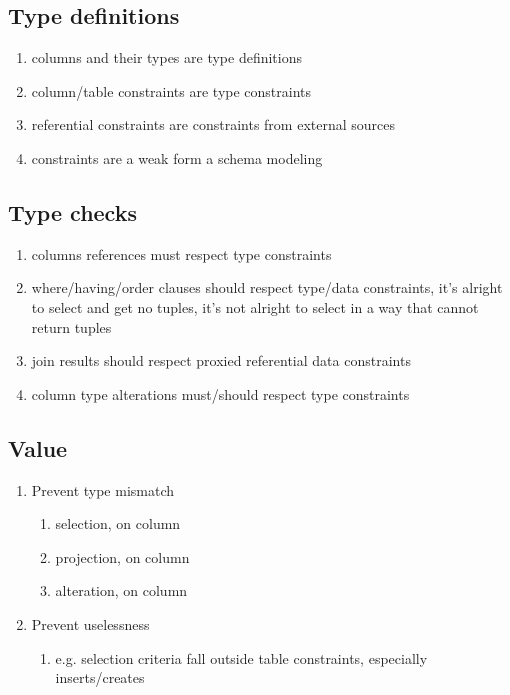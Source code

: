 \documentclass[12pt]{article}
\begin{document}
\subsection{Type definitions}

\begin{enumerate}
  \item columns and their types are type definitions
  \item column/table constraints are type constraints
  \item referential constraints are constraints from external sources
  \item constraints are a weak form a schema modeling
\end{enumerate}

\subsection{Type checks}

\begin{enumerate}
  \item columns references must respect type constraints
  \item where/having/order clauses should respect type/data constraints, it's alright to select and get no tuples, it's not alright to select in a way that cannot return tuples
  \item join results should respect proxied referential data constraints
  \item column type alterations must/should respect type constraints
\end{enumerate}

\subsection{Value}
\begin{enumerate}
  \item Prevent type mismatch
    \begin{enumerate}
      \item selection,  on  column
      \item projection,  on  column
      \item alteration,  on  column
    \end{enumerate}
  \item Prevent uselessness
    \begin{enumerate}
      \item e.g. selection criteria fall outside table constraints, especially inserts/creates
    \end{enumerate}
\end{enumerate}
\end{document}
